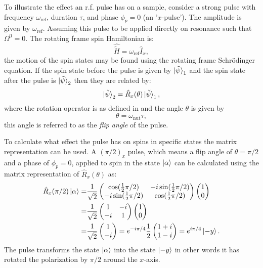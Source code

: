 To illustrate the effect an r.f. pulse has on a sample, consider a strong
pulse with frequency $\omega_\text{ref}$, duration $\tau$, and phase $\phi_p = 0$ (an '$x$-pulse').
The amplitude is given by $\omega_\text{ref}$. Assuming this pulse to be applied
directly on resonance such that $\Omega^0 = 0$.
The rotating frame spin Hamiltonian is:
\begin{equation}
  \hat{\tilde{H}} = \omega_{\text{ref}}\hat{I}_x,
\end{equation}
the motion of the spin states may be found using the rotating frame Schr\"odinger equation. If the
spin state before the pulse is given by $\ket{\tilde{\psi}}_1$ and the spin state after the pulse
is $\ket{\tilde{\psi}}_2$ then they are related by:
\begin{equation}
  \ket{\tilde{\psi}}_2 = \hat{R}_x(\theta)\ket{\tilde{\psi}}_1,
\end{equation}
where the rotation operator is as defined in  and the angle
$\theta$ is given by
\begin{equation}
  \theta = \omega_\text{nut}\tau,
\end{equation}
this angle is referred to as the \textit{flip angle} of the pulse.

To calculate what effect the pulse has on spins in specific states the matrix representation can be used.
A $(\pi/2)_x$ pulse, which means a flip angle of $\theta = \pi/2$ and a phase of $\phi_p = 0$, applied to spin in the state $\ket{\alpha}$ can be calculated using the matrix representation of $\hat{R}_x(\theta)$  as:
\begin{align}
  \hat{R}_x(\pi/2)\ket{\alpha} =& \frac{1}{\sqrt{2}}\begin{pmatrix}
     \cos(\frac{1}{2}\pi/2) & -i\sin(\frac{1}{2}\pi/2)\\
     -i\sin(\frac{1}{2}\pi/2) & \cos(\frac{1}{2}\pi/2)
\end{pmatrix}\begin{pmatrix}
  1\\
  0
\end{pmatrix}\\ =& \frac{1}{\sqrt{2}}\begin{pmatrix}
  1 & -i\\
  -i & 1
\end{pmatrix}\begin{pmatrix}
  1\\
  0
\end{pmatrix}\\ =& \frac{1}{\sqrt{2}}\begin{pmatrix}
  1\\
  -i
\end{pmatrix} = e^{-i\pi/4}\frac{1}{2}\begin{pmatrix}
  1+i\\
  1-i
\end{pmatrix} = e^{i\pi/4}\ket{-y}.
\end{align}
The pulse transforms the state $\ket{\alpha}$ into the state $\ket{-y}$ in other words
it has rotated the polarization by $\pi/2$ around the $x$-axis.


